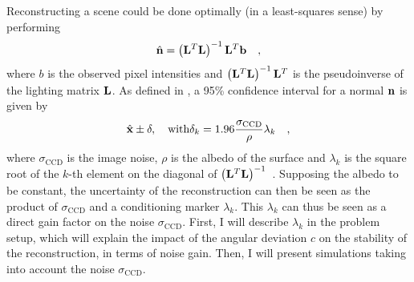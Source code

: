 \documentclass{report}
\begin{document}
Reconstructing a scene could be done optimally (in a least-squares sense) by performing
\begin{equation}
\hat{\mathbf{n}} = \left( \mathbf{L}^T\mathbf{L}\right)^{-1} \mathbf{L}^T \mathbf{b}
\quad,
\end{equation}
where $b$ is the observed pixel intensities and $\left( \mathbf{L}^T\mathbf{L}\right)^{-1} \mathbf{L}^T$ is the pseudoinverse of the lighting matrix $\mathbf{L}$.
As defined in \cite{holdgeoffroy-3dv-15}, a 95\% confidence interval for a normal $\mathbf{n}$ is given by
\begin{equation}
\hat{\mathbf{x}} \pm \mathbf{\delta} , \quad \text{with} \delta_k = 1.96\frac{\sigma_{\text{CCD}}}{\rho}\lambda_k
\quad,
\end{equation}
where $\sigma_\text{CCD}$ is the image noise, $\rho$ is the albedo of the surface and $\lambda_k$ is the square root of the $k$-th element on the diagonal of $\left(\mathbf{L}^T\mathbf{L}\right)^{-1}$~\cite{Hastie-09}.
Supposing the albedo to be constant, the uncertainty of the reconstruction can then be seen as the product of $\sigma_\text{CCD}$ and a conditioning marker $\lambda_k$. This $\lambda_k$ can thus be seen as a direct gain factor on the noise $\sigma_\text{CCD}$. First, I will describe $\lambda_k$ in the problem setup, which will explain the impact of the angular deviation $c$ on the stability of the reconstruction, in terms of noise gain. Then, I will present simulations taking into account the noise $\sigma_\text{CCD}$.
\end{document}
